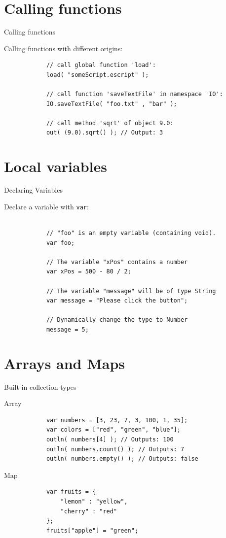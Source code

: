 \documentclass[ucs,9pt]{beamer}
\begin{document}
\section{Calling functions}
\begin{frame}[fragile]{Calling functions}
	\begin{block}{Calling functions with different origins:}
		\begin{lstlisting}
			// call global function 'load':
			load( "someScript.escript" );  
			
			// call function 'saveTextFile' in namespace 'IO':
			IO.saveTextFile( "foo.txt" , "bar" ); 
			
			// call method 'sqrt' of object 9.0:
			out( (9.0).sqrt() ); // Output: 3
		\end{lstlisting}
	\end{block}
\end{frame}


\section{Local variables}
\begin{frame}[fragile]{Declaring Variables}
	\begin{block}{Declare a variable with \lstinline!var!:}
		\begin{lstlisting}
			
			// "foo" is an empty variable (containing void).
			var foo; 
			
			// The variable "xPos" contains a number
			var xPos = 500 - 80 / 2;

			// The variable "message" will be of type String
			var message = "Please click the button";

			// Dynamically change the type to Number
			message = 5;
		\end{lstlisting}
	\end{block}
\end{frame}

\section{Arrays and Maps}
\begin{frame}[fragile]{Built-in collection types}
	\begin{block}{Array}
		\begin{lstlisting}
			var numbers = [3, 23, 7, 3, 100, 1, 35];
			var colors = ["red", "green", "blue"];
			outln( numbers[4] ); // Outputs: 100
			outln( numbers.count() ); // Outputs: 7
			outln( numbers.empty() ); // Outputs: false
		\end{lstlisting}
	\end{block}
	\begin{block}{Map}
		\begin{lstlisting}
			var fruits = {
			    "lemon" : "yellow",
			    "cherry" : "red"
			};
			fruits["apple"] = "green";
		\end{lstlisting}
	\end{block}
\end{frame}
\end{document}
